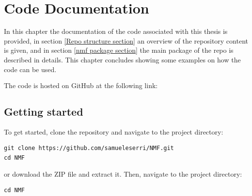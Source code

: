 


\chapter{Code Documentation}\label{code documentation appendix}
In this chapter the documentation of the code associated with this thesis is provided, in section \ref{Repo structure section} an overview of the repository content is given, and in section \ref{nmf package section} the main package of the repo is described in details.
This chapter concludes showing some examples on how the code can be used.

\par
The code is hosted on GitHub at the following link:
\begin{center}
\end{center}
\section{Getting started}
To get started, clone the repository and navigate to the project directory:
\begin{lstlisting}
git clone https://github.com/samueleserri/NMF.git 
cd NMF
\end{lstlisting}    
or download the ZIP file and extract it.
Then, navigate to the project directory:
\begin{lstlisting}
cd NMF
\end{lstlisting}
